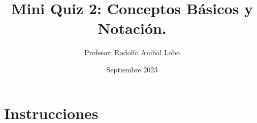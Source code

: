 \documentclass{exam}
\title{Mini Quiz 2: Conceptos Básicos y Notación.}
\author{Profesor: Rodolfo Anibal Lobo}
\date{Septiembre 2023}
\theoremstyle{definition}
\begin{document}
\maketitle



\section*{Instrucciones}

\end{document}
